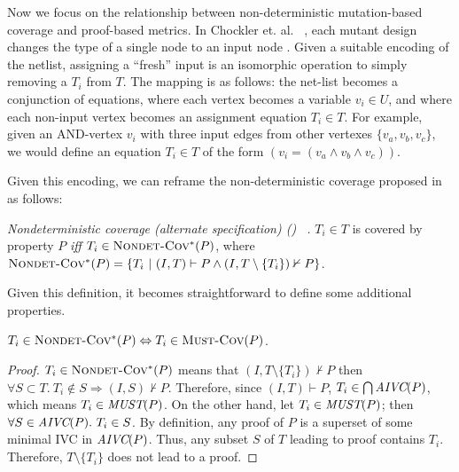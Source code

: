 \iffalse
Now we focus on the relationship between non-deterministic mutation-based coverage and proof-based metrics. In Chockler et. al.
~\cite{chockler2010coverage},
each mutant design changes the type of a single node to an input node .
Given a suitable encoding of the netlist, assigning a ``fresh'' input is an isomorphic operation to simply removing a $T_i$ from $T$. The mapping is as follows: the net-list becomes a conjunction
of equations, where each vertex becomes a variable $v_i \in U$, and where each non-input vertex becomes an assignment equation $T_i \in T$.
For example, given an AND-vertex $v_i$ with three input edges from other vertexes $\{v_a, v_b, v_c\}$, we would define an equation $T_i \in T$ of the form $(v_i = (v_a \wedge v_b \wedge v_c))$.
%

Given this encoding, we can reframe the non-deterministic coverage proposed in \cite{chockler2010coverage} as follows:

\begin{definition} {\emph{Nondeterministic coverage (alternate specification) (\nondetcovalt) ~\cite{chockler2010coverage}.} }
\label{def:non-det-2}
$T_i \in T$ is covered by property $P$ \emph{iff} $T_i \in \text{\sc Nondet-Cov$^{*}$} (P)$, where
$\text{\sc Nondet-Cov$^{*}$} (P) = \{T_i~|~ (I, T) \vdash P \wedge (I, T \setminus \{T_i\}) \nvdash P\}$.
\end{definition}
\noindent Given this definition, it becomes straightforward to define some additional properties.

\begin{lemma}
  \label{lem:must-coverage}
$T_i \in \text{\sc Nondet-Cov$^{*}$} (P) \Leftrightarrow T_i \in \text{\sc Must-Cov}(P)$.
\end{lemma}
\begin{proof}
$T_i \in \text{\sc Nondet-Cov$^{*}$} (P)$ means that $(I, T \setminus \{ T_i \}) \nvdash P$ then
$\forall S \subset T .~ T_i \notin S \Rightarrow (I, S) \nvdash P$.
Therefore, since $(I, T) \vdash P$, $T_i \in \bigcap \textit{AIVC}(P)$, which means  $T_i \in \textit{MUST}(P)$.
On the other hand, let $T_i \in \textit{MUST}(P)$; then $\forall S \in \textit{AIVC}(P).~ T_i \in S$.
By definition, any proof of $P$ is a superset of some minimal IVC in $\textit{AIVC}(P)$.
Thus, any subset $S$ of $T$ leading to proof contains $T_i$.
Therefore, $T \setminus \{ T_i \}$ does not lead to a proof.

\end{proof}
\vspace{2mm}

